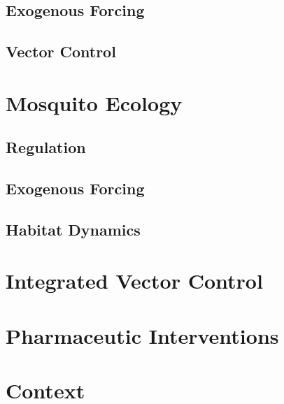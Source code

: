 \documentclass[
]{book}
\begin{document}
\hypertarget{exogenous-forcing}{%
\subsection{Exogenous Forcing}\label{exogenous-forcing}}

\hypertarget{vector-control}{%
\subsection{Vector Control}\label{vector-control}}

\hypertarget{mosquito-ecology-1}{%
\section{Mosquito Ecology}\label{mosquito-ecology-1}}

\hypertarget{regulation-1}{%
\subsection{Regulation}\label{regulation-1}}

\hypertarget{exogenous-forcing-1}{%
\subsection{Exogenous Forcing}\label{exogenous-forcing-1}}

\hypertarget{habitat-dynamics}{%
\subsection{Habitat Dynamics}\label{habitat-dynamics}}

\hypertarget{integrated-vector-control}{%
\section{Integrated Vector Control}\label{integrated-vector-control}}

\hypertarget{pharmaceutic-interventions}{%
\section{Pharmaceutic Interventions}\label{pharmaceutic-interventions}}

\hypertarget{context}{%
\section{Context}\label{context}}
\end{document}

